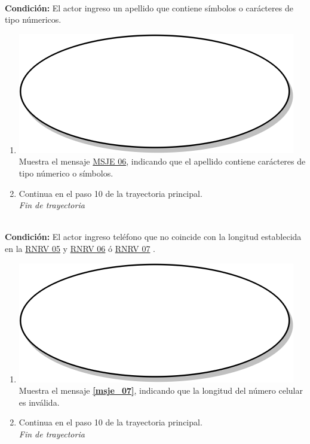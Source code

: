 \textbf{} \\
\textbf{Condición:} El actor ingreso un apellido que contiene símbolos o carácteres de tipo númericos.\\
 \begin{enumerate}[label=H\arabic*]
    \item {\includegraphics[scale=.05]{Capitulo3/img/proceso.png} Muestra el mensaje \hyperref[msje_06]{MSJE 06}, indicando que el apellido contiene carácteres de tipo númerico o símbolos.}
    \item {Continua en el paso 10 de la trayectoria principal.} \\
    \textit{Fin de trayectoria} \\
\end{enumerate}

\textbf{} \\
\textbf{Condición:} El actor ingreso teléfono que no coincide con la longitud establecida en la \hyperref[rnrv_05]{RNRV 05} y \hyperref[rnrv_06]{RNRV 06} ó \hyperref[rnrv_07]{RNRV 07} .\\
 \begin{enumerate}[label=I\arabic*]
    \item {\includegraphics[scale=.05]{Capitulo3/img/proceso.png} Muestra el mensaje \textbf{\ref{msje_07}}, indicando que la longitud del número celular es inválida.}
    \item {Continua en el paso 10 de la trayectoria principal.} \\
    \textit{Fin de trayectoria} \\
\end{enumerate}

